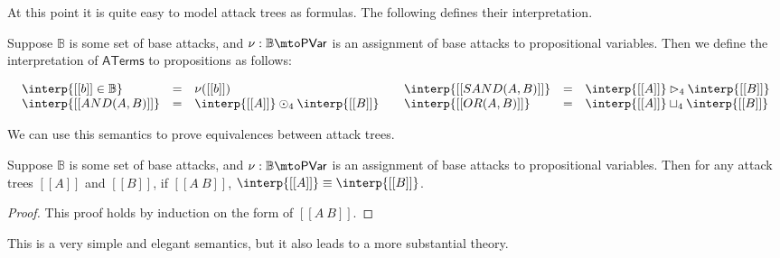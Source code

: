 At this point it is quite easy to model attack trees as formulas.  The
following defines their interpretation.
\begin{definition}
  \label{def:interp-aterms-quaternary}
  Suppose $\mathbb{B}$ is some set of base attacks, and $\nu :
  \mathbb{B} \mto \mathsf{PVar}$ is an assignment of base attacks to
  propositional variables.  Then we define the interpretation of
  $\mathsf{ATerms}$ to propositions as follows:
  \begin{center}
    \begin{math}
      \setlength{\arraycolsep}{5px}
      \begin{array}{lll}
        \begin{array}{lll}
          \interp{[[b]] \in \mathbb{B}} & = & \nu([[b]])\\
          \interp{[[AND(A, B)]]} & = & \interp{[[A]]} \odot_4 \interp{[[B]]}\\
        \end{array}
        &
        \begin{array}{lll}
          \interp{[[SAND(A,B)]]} & = & \interp{[[A]]} \rhd_4 \interp{[[B]]}\\
          \interp{[[OR(A,B)]]} & = & \interp{[[A]]} \sqcup_4 \interp{[[B]]}\\
        \end{array}
      \end{array}
    \end{math}
  \end{center}
\end{definition}
We can use this semantics to prove equivalences between attack trees.
\begin{lemma}
  \label{lemma:equivalence_of_attack_trees}
  Suppose $\mathbb{B}$ is some set of base attacks, and $\nu :
  \mathbb{B} \mto \mathsf{PVar}$ is an assignment of base attacks to
  propositional variables.  Then for any attack trees $[[A]]$ and
  $[[B]]$, if $[[A ~ B]]$, $\interp{[[A]]} \equiv \interp{[[B]]}$.
\end{lemma}
\begin{proof}
  This proof holds by induction on the form of $[[A ~ B]]$.
\end{proof}
This is a very simple and elegant semantics, but it also leads to a
more substantial theory.

